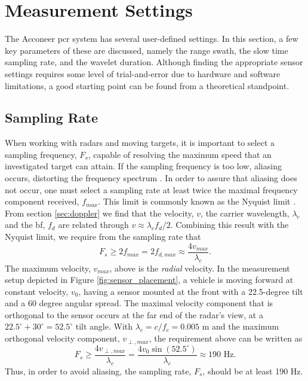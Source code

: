 \section{Measurement Settings}

The Acconeer \gls{pcr} system has several user-defined settings. In this section, a few key parameters of these are discussed, namely the range swath, the slow time sampling rate, and the wavelet duration. Although finding the appropriate sensor settings requires some level of trial-and-error due to hardware and software limitations, a good starting point can be found from a theoretical standpoint. 

\subsection{Sampling Rate}\label{sec:srate}
When working with radars and moving targets, it is important to select a sampling frequency, $F_s$, capable of resolving the maximum speed that an investigated target can attain. If the sampling frequency is too low, aliasing occurs, distorting the frequency spectrum \citep{lindgren_rootzezn_sandsten_2014}. In order to assure that aliasing does not occur, one must select a sampling rate at least twice the maximal frequency component received, $f_{max}$. This limit is commonly known as the Nyquist limit \citep{proakis_manolakis_1995}. From section \ref{sec:doppler} we find that the velocity, $v$, the carrier wavelength, $\lambda_c$ and the \gls{bf}, $f_d$ are related through $v \approx \lambda_cf_d/2$. Combining this result with the Nyquist limit, we require from the sampling rate that
\begin{equation}
	\label{eq:nyquist}
		F_{s} \geq 2f_{max} 
		= 2f_{d,max} 
		\approx \frac{4v_{max}}{\lambda_c}.
\end{equation}
\noindent
The maximum velocity, $v_{max}$, above is the \emph{radial} velocity. In the measurement setup depicted in Figure \ref{fig:sensor_placement}, a vehicle is moving forward at constant velocity, $v_0$, having a sensor mounted at the front with a 22.5-degree tilt and a 60 degree angular spread. The maximal velocity component that is orthogonal to the sensor occurs at the far end of the radar's view, at a $22.5^\circ + 30^\circ = 52.5^\circ$ tilt angle. With $\lambda_c=c/f_c=0.005$ m and the maximum orthogonal velocity component, $v_{\perp, max}$, the requirement above can be written as
\begin{equation}
	F_s \geq 
	\frac{4v_{\perp, max}}{\lambda_c}
	= \frac{4v_0\sin(52.5^\circ)}{\lambda_c} 
	\approx 190 \text{ Hz}.
\end{equation}
\noindent
Thus, in order to avoid aliasing, the sampling rate, $F_s$, should be at least 190 Hz. 


